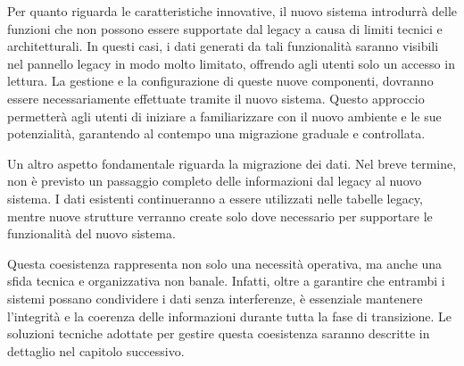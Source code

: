 Per quanto riguarda le caratteristiche innovative, il nuovo sistema introdurrà delle funzioni che non possono essere supportate dal legacy a causa di limiti tecnici e architetturali. In questi casi, i dati generati da tali funzionalità saranno visibili nel pannello legacy in modo molto limitato, offrendo agli utenti solo un accesso in lettura. La gestione e la configurazione di queste nuove componenti, dovranno essere necessariamente effettuate tramite il nuovo sistema. Questo approccio permetterà agli utenti di iniziare a familiarizzare con il nuovo ambiente e le sue potenzialità, garantendo al contempo una migrazione graduale e controllata.

Un altro aspetto fondamentale riguarda la migrazione dei dati. Nel breve termine, non è previsto un passaggio completo delle informazioni dal legacy al nuovo sistema. I dati esistenti continueranno a essere utilizzati nelle tabelle legacy, mentre nuove strutture verranno create solo dove necessario per supportare le funzionalità del nuovo sistema.

Questa coesistenza rappresenta non solo una necessità operativa, ma anche una sfida tecnica e organizzativa non banale. Infatti, oltre a garantire che entrambi i sistemi possano condividere i dati senza interferenze, è essenziale mantenere l’integrità e la coerenza delle informazioni durante tutta la fase di transizione. Le soluzioni tecniche adottate per gestire questa coesistenza saranno descritte in dettaglio nel capitolo successivo.
